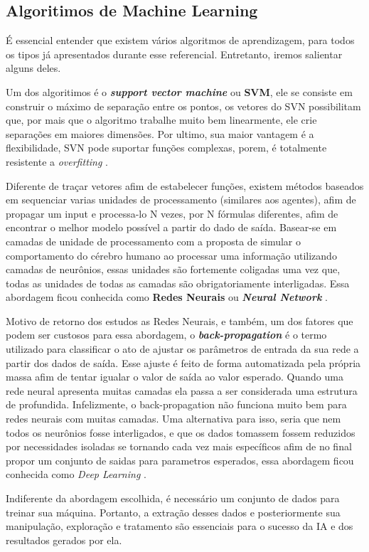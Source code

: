 \subsection{Algoritimos de Machine Learning}
É essencial entender que existem vários algoritmos de aprendizagem, para todos os tipos já apresentados durante esse referencial. Entretanto, iremos salientar alguns deles.

Um dos algoritimos é o \textit{\textbf{support vector machine}} ou \textbf{SVM}, ele se consiste em construir o máximo de separação entre os pontos, os vetores do SVN possibilitam que, por mais que o algoritmo trabalhe muito bem linearmente, ele crie separações em maiores dimensões. Por ultimo, sua maior vantagem é a flexibilidade, SVN pode suportar funções complexas, porem, é totalmente resistente a \textit{overfitting} \cite[744]{russel2003artificial}.

Diferente de traçar vetores afim de estabelecer funções, existem métodos baseados em sequenciar varias unidades de processamento (similares aos agentes), afim de propagar um input e processa-lo N vezes, por N fórmulas diferentes, afim de encontrar o melhor modelo possível a partir do dado de saída. Basear-se em camadas de unidade de processamento com a proposta de simular o comportamento do cérebro humano ao processar uma informação utilizando camadas de neurônios, essas unidades são fortemente coligadas uma vez que, todas as unidades de todas as camadas são obrigatoriamente interligadas. Essa abordagem ficou conhecida como \textbf{Redes Neurais} ou \textbf{\textit{Neural Network}} \cite{haykin2004comprehensive, russel2003artificial}.

Motivo de retorno dos estudos as Redes Neurais, e também, um dos fatores que podem ser custosos para essa abordagem, o \textbf{\textit{back-propagation}} é o termo utilizado para classificar o ato de ajustar os parâmetros de entrada da sua rede a partir dos dados de saída. Esse ajuste é feito de forma automatizada pela própria massa afim de tentar igualar o valor de saída ao valor esperado. Quando uma rede neural apresenta muitas camadas ela passa a ser considerada uma estrutura de profundida. Infelizmente, o back-propagation não funciona muito bem para redes neurais com muitas camadas. Uma alternativa para isso, seria que nem todos os neurônios fosse interligados, e que os dados tomassem fossem reduzidos por necessidades isoladas se tornando cada vez mais específicos afim de no final propor um conjunto de saidas para parametros esperados, essa abordagem ficou conhecida como \textit{Deep Learning} \cite{lecun2015deep}.

Indiferente da abordagem escolhida, é necessário um conjunto de dados para treinar sua máquina. Portanto, a extração desses dados e posteriormente sua manipulação, exploração e tratamento são essenciais para o sucesso da IA e dos resultados gerados por ela.


